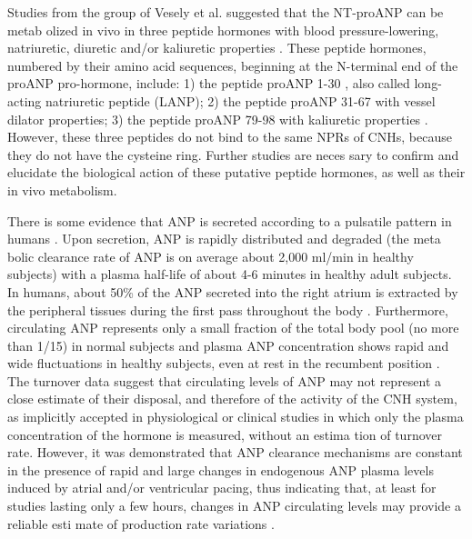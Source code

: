 \documentclass[14pt,a4paper,onecolumn]{extarticle}
\begin{document}
Studies from the group of Vesely et al. suggested that the NT-proANP can be metab olized in vivo in three peptide hormones with blood pressure-lowering, natriuretic, diuretic and/or kaliuretic properties \citep{100}. These peptide hormones, numbered by their amino acid sequences, beginning at the N-terminal end of the proANP pro-hormone, include: 1) the peptide proANP 1-30 , also called long-acting natriuretic peptide (LANP); 2) the peptide proANP 31-67 with vessel dilator properties; 3) the peptide proANP 79-98 with kaliuretic properties \citep{98}. However, these three peptides do not bind to the same NPRs of CNHs, because they do not have the cysteine ring. Further studies are neces sary to confirm and elucidate the biological action of these putative peptide hormones, as well as their in vivo metabolism.

There is some evidence that ANP is secreted according to a pulsatile pattern in humans \citep{193} \citep{194} \citep{195} \citep{196} \citep{197}. Upon secretion, ANP is rapidly distributed and degraded (the meta bolic clearance rate of ANP is on average about 2,000 ml/min in healthy subjects) with a plasma half-life of about 4-6 minutes in healthy adult subjects. In humans, about 50\% of the ANP secreted into the right atrium is extracted by the peripheral tissues during the first pass throughout the body \citep{198} \citep{199} \citep{200} \citep{201}. Furthermore, circulating ANP represents only a small fraction of the total body pool (no more than 1/15) in normal subjects and plasma ANP concentration shows rapid and wide fluctuations in healthy subjects, even at rest in the recumbent position \citep{198} \citep{199} \citep{200} \citep{201}. The turnover data suggest that circulating levels of ANP may not represent a close estimate of their disposal, and therefore of the activity of the CNH system, as implicitly accepted in physiological or clinical studies in which only the plasma concentration of the hormone is measured, without an estima tion of turnover rate. However, it was demonstrated that ANP clearance mechanisms are constant in the presence of rapid and large changes in endogenous ANP plasma levels induced by atrial and/or ventricular pacing, thus indicating that, at least for studies lasting only a few hours, changes in ANP circulating levels may provide a reliable esti mate of production rate variations \citep{201}.
\end{document}
